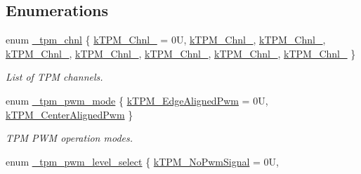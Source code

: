 \subsection*{Enumerations}
\begin{DoxyCompactItemize}
\item 
enum \mbox{\hyperlink{group__tpm_gacc39a4172737e2409c9b198604b1b4a4}{\+\_\+tpm\+\_\+chnl}} \{ \newline
\mbox{\hyperlink{group__tpm_ggacc39a4172737e2409c9b198604b1b4a4a46ff50014bfb5cde17435197d2832043}{k\+T\+P\+M\+\_\+\+Chnl\+\_}} = 0U, 
\mbox{\hyperlink{group__tpm_ggacc39a4172737e2409c9b198604b1b4a4a7d807066dff21ee14beb69b6095e35f5}{k\+T\+P\+M\+\_\+\+Chnl\+\_}}, 
\mbox{\hyperlink{group__tpm_ggacc39a4172737e2409c9b198604b1b4a4a5e72f0a94f0b95b5bd3741f57496f8fe}{k\+T\+P\+M\+\_\+\+Chnl\+\_}}, 
\mbox{\hyperlink{group__tpm_ggacc39a4172737e2409c9b198604b1b4a4a94949003c1c6df144f831cbd1b0ad96b}{k\+T\+P\+M\+\_\+\+Chnl\+\_}}, 
\newline
\mbox{\hyperlink{group__tpm_ggacc39a4172737e2409c9b198604b1b4a4a3869ab1eaba51de758fbe8ee5d0e270e}{k\+T\+P\+M\+\_\+\+Chnl\+\_}}, 
\mbox{\hyperlink{group__tpm_ggacc39a4172737e2409c9b198604b1b4a4af036665843a1a13b7a2a91072474cd2b}{k\+T\+P\+M\+\_\+\+Chnl\+\_}}, 
\mbox{\hyperlink{group__tpm_ggacc39a4172737e2409c9b198604b1b4a4a010c5e2f251cd53842145ab272949cd1}{k\+T\+P\+M\+\_\+\+Chnl\+\_}}, 
\mbox{\hyperlink{group__tpm_ggacc39a4172737e2409c9b198604b1b4a4a53c9083b38615280db7bc79bd106d7ef}{k\+T\+P\+M\+\_\+\+Chnl\+\_}}
 \}
\begin{DoxyCompactList}\small\item\em List of T\+PM channels. \end{DoxyCompactList}\item 
enum \mbox{\hyperlink{group__tpm_gad7846db814bfb6055814736b8325b668}{\+\_\+tpm\+\_\+pwm\+\_\+mode}} \{ \mbox{\hyperlink{group__tpm_ggad7846db814bfb6055814736b8325b668ac3655841b72d48d51513dbe7bfe2c6fe}{k\+T\+P\+M\+\_\+\+Edge\+Aligned\+Pwm}} = 0U, 
\mbox{\hyperlink{group__tpm_ggad7846db814bfb6055814736b8325b668a9e201f84919cf715746382741a708263}{k\+T\+P\+M\+\_\+\+Center\+Aligned\+Pwm}}
 \}
\begin{DoxyCompactList}\small\item\em T\+PM P\+WM operation modes. \end{DoxyCompactList}\item 
enum \mbox{\hyperlink{group__tpm_ga1efad91e0bd88db60f58667c720d472c}{\+\_\+tpm\+\_\+pwm\+\_\+level\+\_\+select}} \{ \mbox{\hyperlink{group__tpm_gga1efad91e0bd88db60f58667c720d472caf23b8097a9d46a24efdfdee6ed1cdcca}{k\+T\+P\+M\+\_\+\+No\+Pwm\+Signal}} = 0U, 

\end{DoxyCompactItemize}
